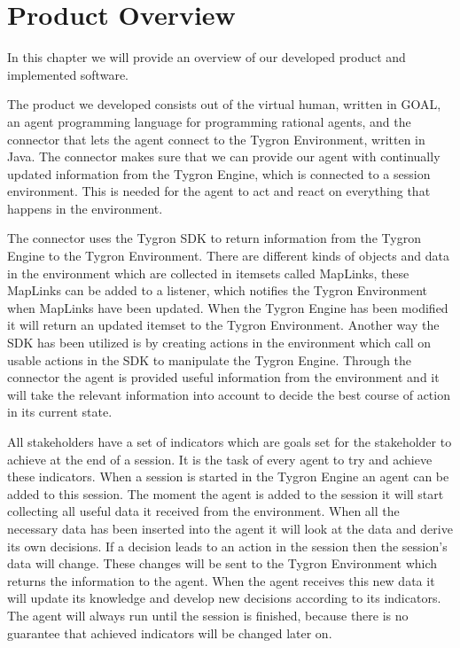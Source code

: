 \chapter[Overview of the software product]{Product Overview}

In this chapter we will provide an overview of our developed product and implemented software.

The product we developed consists out of the virtual human, written in GOAL, an agent programming language for programming rational agents, and the connector that lets the agent connect to the Tygron Environment, written in Java. The connector makes sure that we can provide our agent with continually updated information from the Tygron Engine, which is connected to a session environment. This is needed for the agent to act and react on everything that happens in the environment.

The connector uses the Tygron SDK to return information from the Tygron Engine to the Tygron Environment. There are different kinds of objects and data in the environment which are collected in itemsets called MapLinks, these MapLinks can be added to a listener, which notifies the Tygron Environment when MapLinks have been updated. When the Tygron Engine has been modified it will return an updated itemset to the Tygron Environment. Another way the SDK has been utilized is by creating actions in the environment which call on usable actions in the SDK to manipulate the Tygron Engine. Through the connector the agent is provided useful information from the environment and it will take the relevant information into account to decide the best course of action in its current state.

All stakeholders have a set of indicators which are goals set for the stakeholder to achieve at the end of a session. It is the task of every agent to try and achieve these indicators. When a session is started in the Tygron Engine an agent can be added to this session. The moment the agent is added to the session it will start collecting all useful data it received from the environment. When all the necessary data has been inserted into the agent it will look at the data and derive its own decisions. If a decision leads to an action in the session then the session's data will change. These changes will be sent to the Tygron Environment which returns the information to the agent. When the agent receives this new data it will update its knowledge and develop new decisions according to its indicators. The agent will always run until the session is finished, because there is no guarantee that achieved indicators will be changed later on.

\newpage